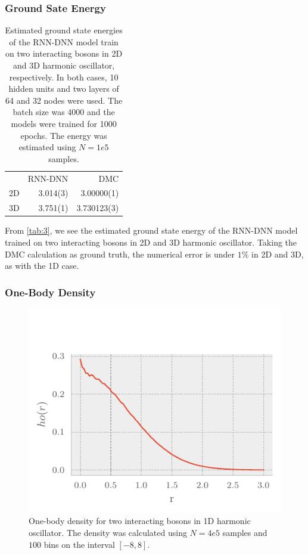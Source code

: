 \subsubsection{Ground Sate Energy}

\begin{table}[ht]
	\begin{tabular}{r|rr}
		\toprule
		      & RNN-DNN   & DMC     \\
		2D    & 3.014(3)  &  3.00000(1) \\
		3D    & 3.751(1)  &   3.730123(3) \\
		\bottomrule
	\end{tabular}
	\caption{Estimated ground state energies of the RNN-DNN model train on two interacting bosons in 2D and 3D harmonic oscillator, respectively. In both cases, 10 hidden units and two layers of 64 and 32 nodes were used. The batch size was 4000 and the models were trained for 1000 epochs. The energy was estimated using $N=1e5$ samples.}
	\label{tab:3}
\end{table}

From \autoref{tab:3}, we see the estimated ground state energy of the RNN-DNN model trained on two interacting bosons in 2D and 3D harmonic oscillator. Taking the DMC calculation as ground truth, the numerical error is under $1\%$ in 2D and 3D, as with the 1D case. 

\subsubsection{One-Body Density}
\begin{figure}[H]
	\includegraphics[]{figures/many_part_3D.pdf}
	\caption{One-body density for two interacting bosons in 1D harmonic oscillator. The density was calculated using $N=4e5$ samples and $100$ bins on the interval $[-8,8]$.}
	\label{fig:many_part_3D}
\end{figure}

